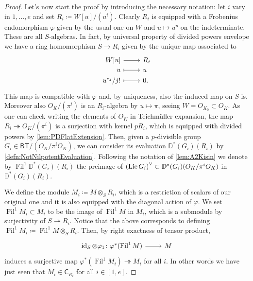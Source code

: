 \begin{proof}
Let's now start the proof by introducing the necessary notation:
let $i$ vary in $1, \ldots, e$ and set $R_i \coloneqq W[u]/ (u^i)$.
Clearly $R_i$ is equipped with a Frobenius endomorphism $\varphi$
given by the usual one on $W$ and $u \mapsto u^p$ on the indeterminate.
These are all $S$-algebras.
In fact, by universal property of divided powers envelope
we have a ring homomorphism $S \to R_i$ given by the unique map associated to
\begin{equation*}
\begin{tikzcd}[row sep = 0ex
	,/tikz/column 1/.append style={anchor=base east}
	,/tikz/column 2/.append style={anchor=base west}]
	W[u] \arrow[r, "", rightarrow] &
	R_i \\
	u \arrow[r, "", mapsto] & u \\
	u^{ej} / j!  \arrow[r, "", mapsto] & 0
.\end{tikzcd}
\end{equation*} 
This map is compatible with $\varphi$ and, by uniqueness, also
the induced map on $S$ is.
Moreover also $O_K/ (\pi^i)$ is an $R_i$-algebra by $u \mapsto \pi$,
seeing $W = O_{K_0} \subset O_K$.
As one can check writing the elements of $O_K$ in Teichmüller expansion,
the map $R_i \twoheadrightarrow O_K/ (\pi^i)$ is a surjection
with kernel $pR_i$, which is equipped with divided powers by \cref{lem:PDFlatExtension}.
Then, given a $p$-divisible group $G_i \in \mathsf{BT}/ (O_K/ \pi^iO_K)$,
we can consider its evaluation $\mathbb{D}^*(G_i)(R_i)$ by \cref{defn:NotNilpotentEvaluation}.
Following the notation of \cref{lem:A2Kisin}
we denote by $\operatorname{Fil}^1\mathbb{D}^*(G_i)(R_i)$
the preimage of $\left( \operatorname{Lie} G_i \right)^\vee \subset \mathbb{D}^*(G_i)(O_K/\pi^iO_K)$
in $\mathbb{D}^*(G_i)(R_i)$.

We define the module $M_i \coloneqq M \otimes_S R_i$,
which is a restriction of scalars of our original one and
it is also equipped with the diagonal action of $\varphi$.
We set $\operatorname{Fil}^1 M_i \subset M_i$
to be the image of $\operatorname{Fil}^1 M$ in $M_i$, which is a submodule
by surjectivity of $S \twoheadrightarrow R_i$.
Notice that the above corresponds to defining $\operatorname{Fil}^1 M_i \coloneqq
\operatorname{Fil}^1 M \otimes_S R_i$.
Then, by right exactness of tensor product, 
\begin{equation*}
\begin{tikzcd}[row sep = 0ex
	,/tikz/column 1/.append style={anchor=base east}
	,/tikz/column 2/.append style={anchor=base west}]
	\id_{ S } \otimes \varphi_1
	\colon 
	\varphi^*(\operatorname{Fil}^1 M)\arrow[r, "", rightarrow] &
	M
\end{tikzcd}
\end{equation*} 
induces a surjective map $\varphi^*(\operatorname{Fil}^1 M_i) \twoheadrightarrow M_i$
for all $i$.
In other words we have just seen that
$M_i \in \mathsf{C}_{R_i}$ for all $i \in [1,e]$.


\end{proof}
